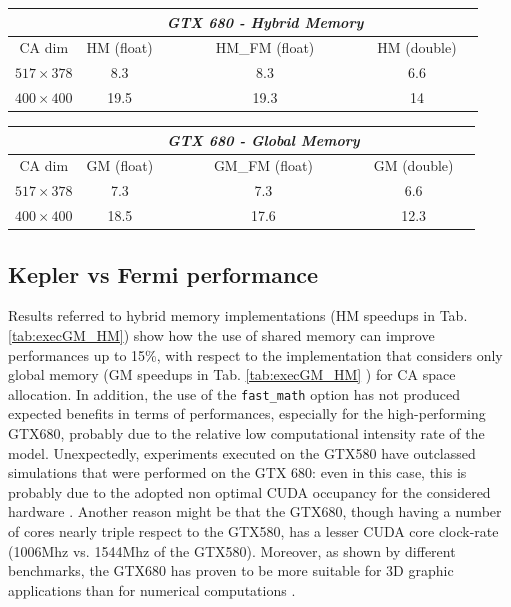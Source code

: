 {\begin{table}
\begin{center}
\vspace{20pt}

\begin{tabular}{ccccc}
& & \textit{GTX 680 - Hybrid Memory} & &\\
\hline
CA dim &   HM (float) & HM\_FM (float) &  HM (double) \\
\hline
$517 \times 378$ & 8.3 & 8.3 & 6.6  \\
$400 \times 400 $ & 19.5 & 19.3 & 14 \\
\hline
\end{tabular}

\vspace{10pt}

\begin{tabular}{ccccc}
& & \textit{GTX 680 - Global Memory} & &\\
\hline
CA dim &   GM (float) &  GM\_FM (float) & GM (double) \\
\hline
$517 \times 378$ & 7.3 & 7.3 & 6.6 \\
$400 \times 400 $ & 18.5 & 17.6 & 12.3 \\

\hline
\end{tabular}


\end{center}
\end{table}
}




\subsection{Kepler vs Fermi performance}
Results referred to hybrid memory implementations (HM speedups in Tab.
\ref{tab:execGM_HM}) show how the use of
shared memory can improve performances up to 15\%, with respect to the
implementation that considers only global memory (GM speedups in Tab.
\ref{tab:execGM_HM} ) for CA space
allocation. In addition, the use of the \texttt{fast\_math} option has not
produced expected benefits in terms of performances, especially for the
high-performing GTX680, probably due to the relative low computational intensity
rate of the model. Unexpectedly, experiments executed on the GTX580 have
outclassed simulations that were performed on the GTX 680: even in this case,
this is probably due to the adopted non optimal CUDA occupancy for the
considered hardware \cite{Kirk2010}. Another reason might be that the
GTX680, though having a number of cores nearly triple respect to the GTX580, has
a lesser CUDA core clock-rate (1006Mhz vs. 1544Mhz of the GTX580). Moreover, as
shown by different benchmarks, the GTX680 has proven to be more suitable for 3D
graphic applications than for numerical computations \cite{gurusite2013}.



